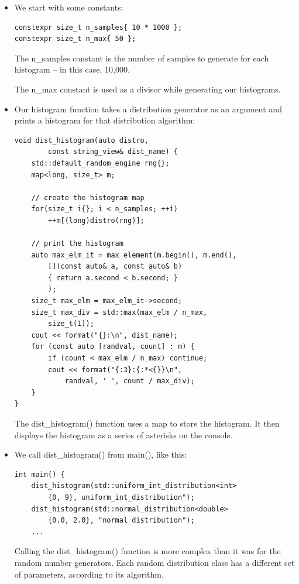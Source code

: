 \begin{itemize}
\item 
We start with some constants:

\begin{lstlisting}[style=styleCXX]
constexpr size_t n_samples{ 10 * 1000 };
constexpr size_t n_max{ 50 };
\end{lstlisting}

The n\_samples constant is the number of samples to generate for each histogram – in this case, 10,000.

The n\_max constant is used as a divisor while generating our histograms.

\item 
Our histogram function takes a distribution generator as an argument and prints a histogram for that distribution algorithm:

\begin{lstlisting}[style=styleCXX]
void dist_histogram(auto distro,
		const string_view& dist_name) {
	std::default_random_engine rng{};
	map<long, size_t> m;
	
	// create the histogram map
	for(size_t i{}; i < n_samples; ++i)
		++m[(long)distro(rng)];
	
	// print the histogram
	auto max_elm_it = max_element(m.begin(), m.end(),
		[](const auto& a, const auto& b)
		{ return a.second < b.second; }
		);
	size_t max_elm = max_elm_it->second;
	size_t max_div = std::max(max_elm / n_max,
		size_t(1));
	cout << format("{}:\n", dist_name);
	for (const auto [randval, count] : m) {
		if (count < max_elm / n_max) continue;
		cout << format("{:3}:{:*<{}}\n",
			randval, ' ', count / max_div);
	}
}
\end{lstlisting}

The dist\_histogram() function uses a map to store the histogram. It then displays the histogram as a series of asterisks on the console.

\item 
We call dist\_histogram() from main(), like this:

\begin{lstlisting}[style=styleCXX]
int main() {
	dist_histogram(std::uniform_int_distribution<int>
		{0, 9}, uniform_int_distribution");
	dist_histogram(std::normal_distribution<double>
		{0.0, 2.0}, "normal_distribution");
	...
\end{lstlisting}

Calling the dist\_histogram() function is more complex than it was for the random number generators. Each random distribution class has a different set of parameters, according to its algorithm.


\end{itemize}
